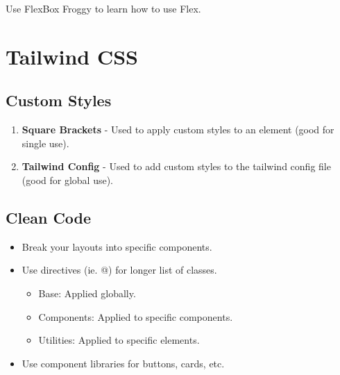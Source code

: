 \documentclass{article}
\begin{document}
\begin{warning}
    Use FlexBox Froggy to learn how to use Flex. 
\end{warning}

\section{Tailwind CSS}
\subsection{Custom Styles}
\begin{definition}
    \begin{enumerate}
        \item \textbf{Square Brackets} - Used to apply custom styles to an element (good for single use).
        \item \textbf{Tailwind Config} - Used to add custom styles to the tailwind config file (good for global use).
    \end{enumerate}
\end{definition}

\subsection{Clean Code}
\begin{definition}
    \begin{itemize}
        \item Break your layouts into specific components.
        \item Use directives (ie. @) for longer list of classes.
        \begin{itemize}
            \item Base: Applied globally.
            \item Components: Applied to specific components.
            \item Utilities: Applied to specific elements.
        \end{itemize}
        \item Use component libraries for buttons, cards, etc.
    \end{itemize}
\end{definition}
\end{document}
